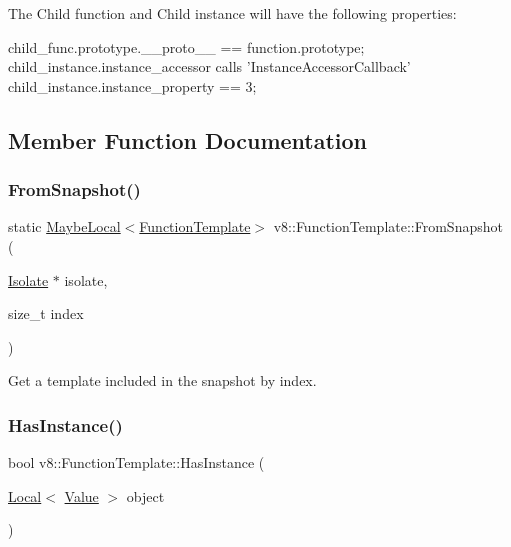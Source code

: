 The Child function and Child instance will have the following properties\+:


\begin{DoxyCode}
child\_func.prototype.\_\_proto\_\_ == \textcolor{keyword}{function}.prototype;
child\_instance.instance\_accessor calls \textcolor{stringliteral}{'InstanceAccessorCallback'}
child\_instance.instance\_property == 3;
\end{DoxyCode}
 

\subsection{Member Function Documentation}
\mbox{\label{classv8_1_1FunctionTemplate_acd9eaca4c7d6de89949b8e1c41f4ba46}} 
\subsubsection{\texorpdfstring{From\+Snapshot()}{FromSnapshot()}}
{\footnotesize\ttfamily static \mbox{\hyperlink{classv8_1_1MaybeLocal}{Maybe\+Local}}$<$\mbox{\hyperlink{classv8_1_1FunctionTemplate}{Function\+Template}}$>$ v8\+::\+Function\+Template\+::\+From\+Snapshot (\begin{DoxyParamCaption}\item[{\mbox{\hyperlink{classv8_1_1Isolate}{Isolate}} $\ast$}]{isolate,  }\item[{size\+\_\+t}]{index }\end{DoxyParamCaption})\hspace{0.3cm}{\ttfamily [static]}}

Get a template included in the snapshot by index. \mbox{\label{classv8_1_1FunctionTemplate_a90d838f3456d300bd19d2a2cb98645bd}} 
\subsubsection{\texorpdfstring{Has\+Instance()}{HasInstance()}}
{\footnotesize\ttfamily bool v8\+::\+Function\+Template\+::\+Has\+Instance (\begin{DoxyParamCaption}\item[{\mbox{\hyperlink{classv8_1_1Local}{Local}}$<$ \mbox{\hyperlink{classv8_1_1Value}{Value}} $>$}]{object }\end{DoxyParamCaption})}


